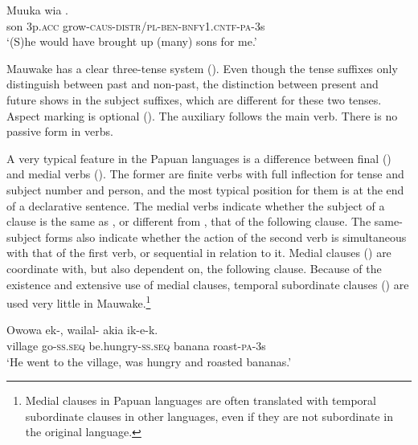 \ea%
\label{ex:1:x664}
\gll Muuka  wia . \\
 son  3p.\textsc{acc}  grow-\textsc{caus}-\textsc{distr/pl}-\textsc{ben}-\textsc{bnfy1.\textsc{cntf}-pa}-3s     \\
\glt `(S)he would have brought up (many) sons for me.'
\z


Mauwake has a clear three-tense system (). Even though the tense suffixes only distinguish between past and non-past, the distinction between present and future shows in the subject suffixes, which are different for these two tenses.  Aspect marking is optional ().  The auxiliary follows the main verb. There is no passive form in verbs.

A very typical feature in the Papuan languages is a difference between final () and medial verbs (). The former are finite verbs with full inflection for tense and subject number and person, and the most typical position for them is at the end of a declarative sentence. The medial verbs indicate whether the subject of a clause is the same as , or different from , that of the following clause. The same-subject forms also indicate whether the action of the second verb is simultaneous with that of the first verb, or sequential  in relation to it. Medial clauses () are coordinate with, but also dependent on, the following clause. Because of the existence and extensive use of medial clauses, temporal subordinate clauses () are used very little in Mauwake.\footnote{Medial clauses in Papuan languages are often translated with temporal subordinate clauses in other languages, even if they are not subordinate in the original language.}

\ea%
\label{ex:1:x662}
\gll Owowa  ek-,  wailal-  akia  ik-e-k. \\
village  go-\textsc{ss.seq} be.hungry-\textsc{ss.seq} banana  roast-\textsc{pa}-3s      \\
\glt `He went to the village, was hungry and roasted bananas.'
\z


